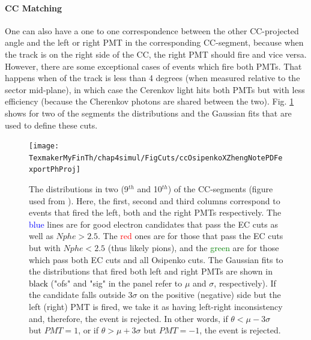 \paragraph{CC \ph Matching}
One can also have a one to one correspondence between the other CC-projected angle \php and the left or right PMT in the corresponding CC-segment, because when the track is on the right side of the CC, the right PMT should fire and vice versa. However, there are some exceptional cases of events which fire both PMTs. That happens when \php of the track is less than 4 degrees (when measured relative to the sector mid-plane), in which case the Cerenkov light hits both PMTs but with less efficiency %
(because the Cherenkov photons are shared between the two). Fig. \ref{ccPhProjDist} shows for two of the segments the \php distributions and the Gaussian fits that are used to define these cuts.
\begin{figure}[H] %
\centering
\leavevmode \texttt{[image: TexmakerMyFinTh/chap4simul/FigCuts/ccOsipenkoXZhengNotePDFexportPhProj]}  %
\caption[CC-projected \ph distributions]{The \php distributions in two (9$^{th}$ and 10$^{th}$) of the CC-segments (figure used from \cite{anaNoteXZheng}). Here, the first, second and third columns correspond to events that fired the left, both and the right PMTs respectively. The \textcolor{blue}{blue} lines are for good electron candidates that pass the EC cuts as well as $Nphe > 2.5$. The \textcolor{red}{red} ones are for those that pass the EC cuts but with $Nphe < 2.5$ (thus likely pions), and the \textcolor{green}{green} are for those which pass both EC cuts and all Osipenko cuts. The Gaussian fits to the distributions that fired both left and right PMTs are shown in \textcolor{black}{black} ("ofs" and "sig" in the panel refer to $\mu$ and $\sigma$, respectively). If the candidate falls outside $3 \sigma$ on the positive (negative) side but the left (right) PMT is fired, we take it as having left-right inconsistency and, therefore, the event is rejected. In other words, if $\theta < \mu - 3 \sigma$ but $PMT=1$, or if $\theta > \mu + 3 \sigma$ but $PMT=-1$, the event is rejected.}
\label{ccPhProjDist}
\end{figure}

